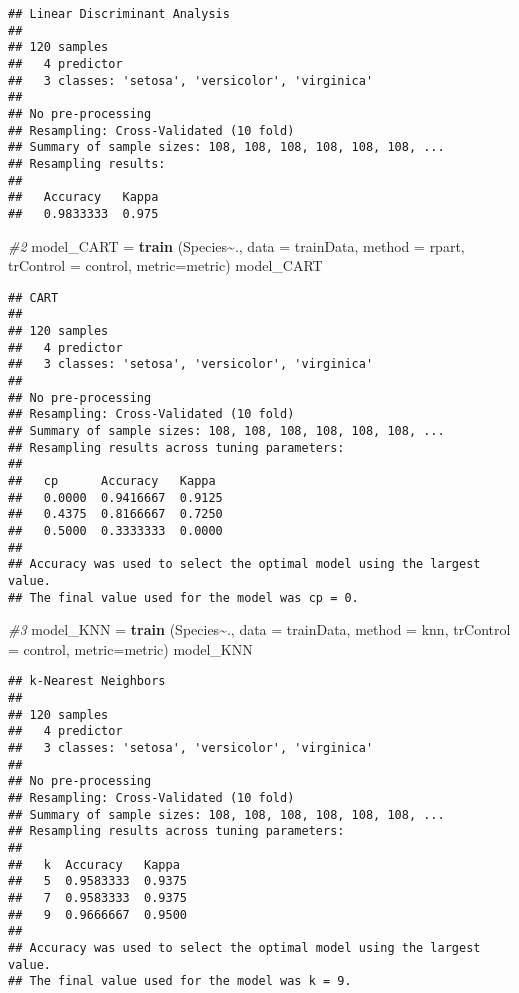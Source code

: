 \documentclass[
]{article}
\newenvironment{Shaded}{\begin{snugshade}}{\end{snugshade}}
\newcommand{\AttributeTok}[1]{\textcolor[rgb]{0.13,0.29,0.53}{#1}}
\newcommand{\CommentTok}[1]{\textcolor[rgb]{0.56,0.35,0.01}{\textit{#1}}}
\newcommand{\FunctionTok}[1]{\textcolor[rgb]{0.13,0.29,0.53}{\textbf{#1}}}
\newcommand{\NormalTok}[1]{#1}
\newcommand{\OtherTok}[1]{\textcolor[rgb]{0.56,0.35,0.01}{#1}}
\newcommand{\SpecialCharTok}[1]{\textcolor[rgb]{0.81,0.36,0.00}{\textbf{#1}}}
\newcommand{\StringTok}[1]{\textcolor[rgb]{0.31,0.60,0.02}{#1}}
\begin{document}
\begin{verbatim}
## Linear Discriminant Analysis 
## 
## 120 samples
##   4 predictor
##   3 classes: 'setosa', 'versicolor', 'virginica' 
## 
## No pre-processing
## Resampling: Cross-Validated (10 fold) 
## Summary of sample sizes: 108, 108, 108, 108, 108, 108, ... 
## Resampling results:
## 
##   Accuracy   Kappa
##   0.9833333  0.975
\end{verbatim}

\begin{Shaded}
\begin{Highlighting}[]
\CommentTok{\#2}
\NormalTok{model\_CART }\OtherTok{=} \FunctionTok{train}\NormalTok{ (Species}\SpecialCharTok{\textasciitilde{}}\NormalTok{., }\AttributeTok{data =}\NormalTok{ trainData, }\AttributeTok{method =} \StringTok{\textquotesingle{}rpart\textquotesingle{}}\NormalTok{, }\AttributeTok{trControl =}\NormalTok{ control, }\AttributeTok{metric=}\NormalTok{metric)}
\NormalTok{model\_CART}
\end{Highlighting}
\end{Shaded}

\begin{verbatim}
## CART 
## 
## 120 samples
##   4 predictor
##   3 classes: 'setosa', 'versicolor', 'virginica' 
## 
## No pre-processing
## Resampling: Cross-Validated (10 fold) 
## Summary of sample sizes: 108, 108, 108, 108, 108, 108, ... 
## Resampling results across tuning parameters:
## 
##   cp      Accuracy   Kappa 
##   0.0000  0.9416667  0.9125
##   0.4375  0.8166667  0.7250
##   0.5000  0.3333333  0.0000
## 
## Accuracy was used to select the optimal model using the largest value.
## The final value used for the model was cp = 0.
\end{verbatim}

\begin{Shaded}
\begin{Highlighting}[]
\CommentTok{\#3}
\NormalTok{model\_KNN }\OtherTok{=} \FunctionTok{train}\NormalTok{ (Species}\SpecialCharTok{\textasciitilde{}}\NormalTok{., }\AttributeTok{data =}\NormalTok{ trainData, }\AttributeTok{method =} \StringTok{\textquotesingle{}knn\textquotesingle{}}\NormalTok{, }\AttributeTok{trControl =}\NormalTok{ control, }\AttributeTok{metric=}\NormalTok{metric)}
\NormalTok{model\_KNN}
\end{Highlighting}
\end{Shaded}

\begin{verbatim}
## k-Nearest Neighbors 
## 
## 120 samples
##   4 predictor
##   3 classes: 'setosa', 'versicolor', 'virginica' 
## 
## No pre-processing
## Resampling: Cross-Validated (10 fold) 
## Summary of sample sizes: 108, 108, 108, 108, 108, 108, ... 
## Resampling results across tuning parameters:
## 
##   k  Accuracy   Kappa 
##   5  0.9583333  0.9375
##   7  0.9583333  0.9375
##   9  0.9666667  0.9500
## 
## Accuracy was used to select the optimal model using the largest value.
## The final value used for the model was k = 9.
\end{verbatim}
\end{document}
